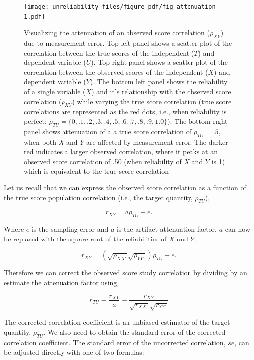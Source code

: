 \documentclass[
  letterpaper,
  DIV=11,
  numbers=noendperiod]{scrreprt}
\begin{document}
\begin{figure}[H]

{\centering \texttt{[image: unreliability\_files/figure-pdf/fig-attenuation-1.pdf]}

}

\caption{\label{fig-attenuation}Visualizing the attenuation of an
observed score correlation (\(\rho_{XY}\)) due to measurement error. Top
left panel shows a scatter plot of the correlation between the true
scores of the independent (\(T\)) and dependent variable (\(U\)). Top
right panel shows a scatter plot of the correlation between the observed
scores of the independent (\(X\)) and dependent variable (\(Y\)). The
bottom left panel shows the reliability of a single variable (\(X\)) and
it's relationship with the observed score correlation (\(\rho_{XY}\))
while varying the true score correlation (true score correlations are
represented as the red dots, i.e., when reliability is perfect;
\(\rho_{TU}=\{0,.1,.2,.3,.4,.5,.6,.7,.8,.9,1.0\}\)). The bottom right
panel shows attenuation of a a true score correlation of
\(\rho_{TU}=.5\), when both \(X\) and \(Y\) are affected by measurement
error. The darker red indicates a larger observed correlation, where it
peaks at an observed score correlation of .50 (when reliability of \(X\)
and \(Y\) is 1) which is equivalent to the true score correlation}

\end{figure}

Let us recall that we can express the observed score correlation as a
function of the true score population correlation (i.e., the target
quantity, \(\rho_{TU}\)),

\[
r_{XY} = a\rho_{TU} + e.
\]

Where \(e\) is the sampling error and \(a\) is the artifact attenuation
factor. \(a\) can now be replaced with the square root of the
reliabilities of \(X\) and \(Y\).

\[
r_{XY} = \left(\sqrt{\rho_{XX'}}\sqrt{\rho_{YY'}}\right) \rho_{TU} + e.
\]

Therefore we can correct the observed score study correlation by
dividing by an estimate the attenuation factor using,

\[
r_{TU} = \frac{r_{XY}}{\hat{a}} = \frac{r_{XY}}{\sqrt{r_{XX'}}\sqrt{r_{YY'}}}
\]

The corrected correlation coefficient is an unbiased estimator of the
target quantity, \(\rho_{TU}\). We also need to obtain the standard
error of the corrected correlation coefficient. The standard error of
the uncorrected correlation, \(se\), can be adjusted directly with one
of two formulas:
\end{document}
